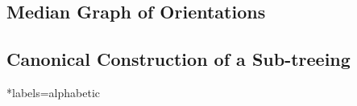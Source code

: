 \documentclass{amsart}
\begin{document}
    \subsection{Median Graph of Orientations}\label{sec:median_graph_of_orientations}

    \subsection{Canonical Construction of a Sub-treeing}\label{sec:borel_cycle_cutting}

    \begin{bibdiv}
        \begin{biblist}*{labels={alphabetic}}
        \end{biblist}
    \end{bibdiv}
\end{document}
